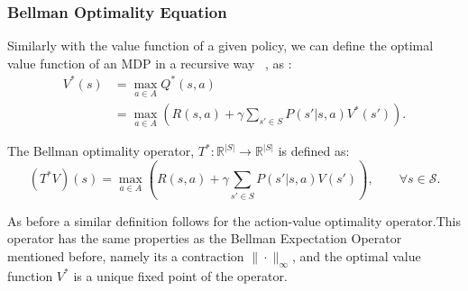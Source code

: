 \subsubsection{Bellman Optimality Equation}
Similarly with the value function of a given policy, we can define the optimal value function of an MDP in a recursive way ~\cite{Sutton:1998:IRL:551283}, as :
\begin{equation}
	\begin{split}
	V^*(s) &=\max_{a \in A}Q^*(s,a)\\
    &=\max_{a \in A}\left( R(s,a)+ \gamma \sum_{s' \in S} P(s'|s,a) V^*(s') \right).
	\end{split}
\end{equation}

\begin{definition}
The Bellman optimality operator, $T^*: \mathbb{R}^{|S|} \rightarrow \mathbb{R}^{|S|}$ is defined as:
\begin{equation}
	(T^*V)(s) =\max_{a \in A}\left( R(s,a)+ \gamma \sum_{s' \in S} P(s'|s,a) V(s') \right), \qquad \forall s \in \mathcal{S}.
	\label{eq:bellman_optimality}
\end{equation}
\end{definition}
As before a similar definition follows for the action-value
 optimality operator.This operator has the same properties as the Bellman Expectation Operator mentioned before, namely its a contraction \wrt $\|\cdot\|_\infty$, and the optimal value function $V^*$ is a unique fixed point of the operator.
